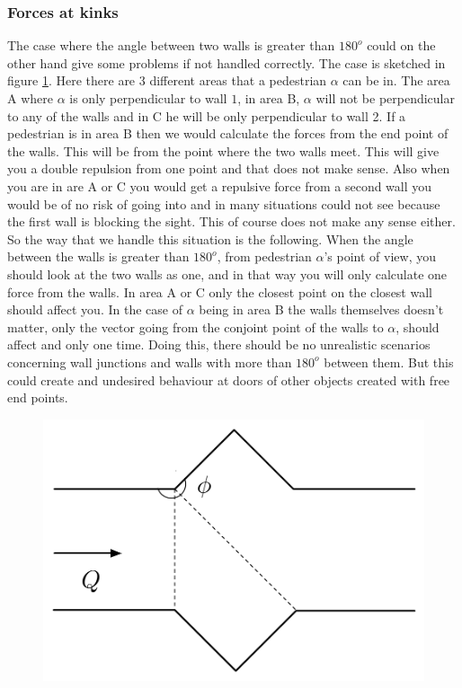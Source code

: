 \subsubsection{Forces at kinks}
The case where the angle between two walls is greater than $180^o$ could on the 
other hand give some problems if not handled correctly. The case is sketched in 
figure \ref{fig:wallcase}. Here there are 3 different areas that a pedestrian $\alpha$ 
can be in. The area A where $\alpha$ is only perpendicular to wall $1$, in area B, 
$\alpha$ will not be perpendicular to any of the walls and in C he will be only 
perpendicular to wall 2. If a pedestrian is in area B then we would calculate the 
forces from the end point of the walls. This will be from the point where the two 
walls meet. This will give you a double repulsion from one point and that 
does not make sense. Also when you are in are A or C you would get a repulsive force 
from a second wall you would be of no risk of going into and in many situations 
could not see because the first wall is blocking the sight. This of course does not 
make any sense either. So the way that we handle this situation is the following. 
When the angle between the walls is greater than $180^o$, from pedestrian $\alpha$'s 
point of view, you should look at the two walls as one, and in that way you will 
only calculate one force from the walls. In area A or C only the closest point 
on the closest wall should affect you. In the case of $\alpha$ being in area B 
the walls themselves doesn't matter, only the vector going from the conjoint 
point of the walls to $\alpha$, should affect and only one time. Doing this, 
there should be no unrealistic scenarios concerning wall junctions and walls 
with more than $180^o$ between them. But this could create and undesired 
behaviour at doors of other objects created with free end points.

\begin{figure}[ht]
\centering
\includegraphics[scale=0.45]{Figures/WallCase.pdf} 
\caption{}\label{fig:wallcase}
\end{figure}

